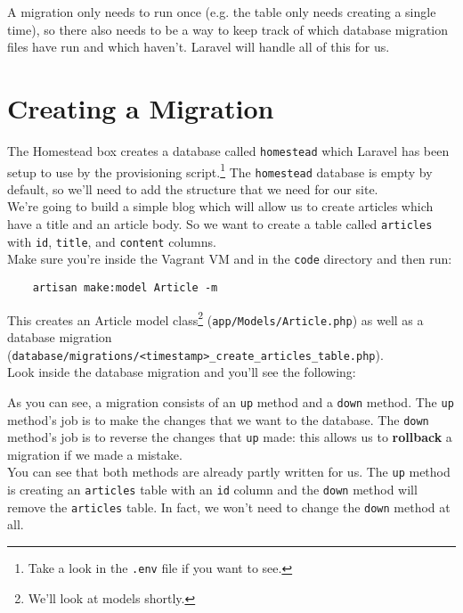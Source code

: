 A migration only needs to run once (e.g. the table only needs creating a single time), so there also needs to be a way to keep track of which database migration files have run and which haven't. Laravel will handle all of this for us.



\section{Creating a Migration}

The Homestead box creates a database called \texttt{homestead} which Laravel has been setup to use by the provisioning script.\footnote{Take a look in the \texttt{.env} file if you want to see.} The \texttt{homestead} database is empty by default, so we'll need to add the structure that we need for our site.
\\

We're going to build a simple blog which will allow us to create articles which have a title and an article body. So we want to create a table called \texttt{articles} with \texttt{id}, \texttt{title}, and \texttt{content} columns.
\\

Make sure you're inside the Vagrant VM and in the \texttt{code} directory and then run:

\begin{verbatim}
    artisan make:model Article -m
\end{verbatim}

This creates an Article model class\footnote{We'll look at models shortly.} (\texttt{app/Models/Article.php}) as well as a database migration (\texttt{database/migrations/<timestamp>\_create\_articles\_table.php}).
\\

Look inside the database migration and you'll see the following:


As you can see, a migration consists of an \texttt{up} method and a \texttt{down} method. The \texttt{up} method's job is to make the changes that we want to the database. The \texttt{down} method's job is to reverse the changes that \texttt{up} made: this allows us to \textbf{rollback} a migration if we made a mistake.
\\

You can see that both methods are already partly written for us. The \texttt{up} method is creating an \texttt{articles} table with an \texttt{id} column and the \texttt{down} method will remove the \texttt{articles} table. In fact, we won't need to change the \texttt{down} method at all.

